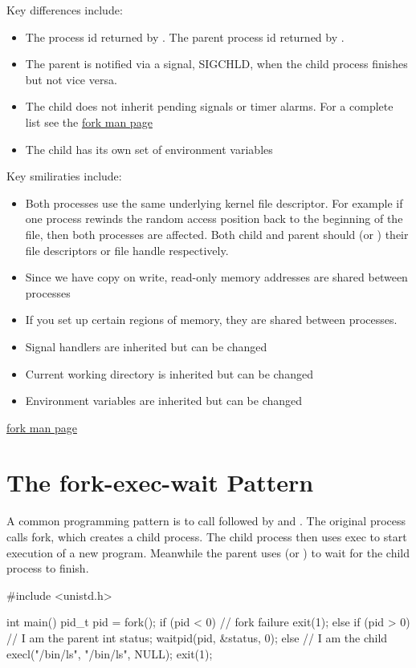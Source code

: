 Key differences include: 
\begin{itemize}
\item The process id returned by . The parent process id returned by . 
\item The parent is notified via a signal, SIGCHLD, when the child process finishes but not vice versa. 
\item The child does not inherit pending signals or timer alarms. For a complete list see the \href{http://man7.org/linux/man-pages/man2/fork.2.html}{fork man page}
\item The child has its own set of environment variables
\end{itemize}

Key smiliraties include:
\begin{itemize}
\item Both processes use the same underlying kernel file descriptor. For example if one process rewinds the random access position back to the beginning of the file, then both processes are affected. Both child and parent should  (or ) their file descriptors or file handle respectively.
\item Since we have copy on write, read-only memory addresses are shared between processes
\item If you set up certain regions of memory, they are shared between processes.
\item Signal handlers are inherited but can be changed
\item Current working directory is inherited but can be changed
\item Environment variables are inherited but can be changed
\end{itemize}

\href{http://linux.die.net/man/2/fork}{fork man page}

\section{The fork-exec-wait Pattern}

A common programming pattern is to call  followed by  and . The original process calls fork, which creates a child process. The child process then uses exec to start execution of a new program. Meanwhile the parent uses  (or ) to wait for the child process to finish. 

\begin{code}[language=C][language=C]
#include <unistd.h>

int main() {
  pid_t pid = fork();
  if (pid < 0) { // fork failure
    exit(1);
  } else if (pid > 0) { // I am the parent
    int status;
    waitpid(pid, &status, 0);
  } else { // I am the child
    execl("/bin/ls", "/bin/ls", NULL);
    exit(1);
  }
}
\end{code}

